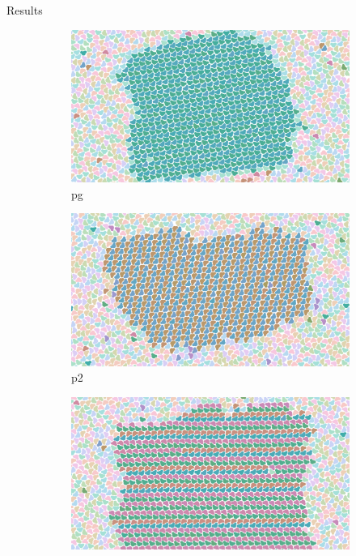 \documentclass{beamer}
\begin{document}
\begin{frame}[t]{}
\begin{columns}[t]
\begin{column}{0.47\linewidth}
\begin{block}{Results}
        \begin{figure}[h]
          \centering
          \begin{subfigure}[t]{\linewidth}
            \centering
              \includegraphics[width=\linewidth]{trimer-cat-pg}
            \caption{pg}
            \label{fig:categorised pg}
          \end{subfigure}
          \begin{subfigure}[t]{\linewidth}
            \centering
              \includegraphics[width=\linewidth]{trimer-cat-p2}
            \caption{p2}
            \label{fig:categorised p2}
          \end{subfigure}
          \begin{subfigure}[t]{\linewidth}
            \centering
              \includegraphics[width=\linewidth]{trimer-cat-p2gg}

\end{subfigure}
\end{figure}
\end{block}
\end{column}
\end{columns}
\end{frame}
\end{document}
